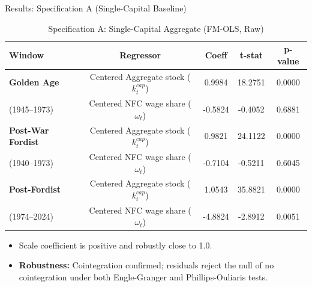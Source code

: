 \documentclass[10pt]{beamer}
\begin{document}
\begin{frame}{Results: Specification A (Single-Capital Baseline)}
  \begin{table}[htbp]
    \centering
    \caption{Specification A: Single-Capital Aggregate (FM-OLS, Raw)}
    \footnotesize
    \begin{tabular}{lcccc}
      \toprule
      \textbf{Window} & \textbf{Regressor} & \textbf{Coeff} & \textbf{t-stat} & \textbf{p-value} \\
      \midrule
      \textbf{Golden Age} & Centered Aggregate stock ($k^{cap}_t$) & 0.9984 & 18.2751 & 0.0000 \\
      (1945--1973) & Centered NFC wage share ($\omega_t$) & -0.5824 & -0.4052 & 0.6881 \\
      \midrule
      \textbf{Post-War Fordist} & Centered Aggregate stock ($k^{cap}_t$) & 0.9821 & 24.1122 & 0.0000 \\
      (1940--1973) & Centered NFC wage share ($\omega_t$) & -0.7104 & -0.5211 & 0.6045 \\
      \midrule
      \textbf{Post-Fordist} & Centered Aggregate stock ($k^{cap}_t$) & 1.0543 & 35.8821 & 0.0000 \\
      (1974--2024) & Centered NFC wage share ($\omega_t$) & -4.8824 & -2.8912 & 0.0051 \\
      \bottomrule
    \end{tabular}
  \end{table}
  \begin{itemize}
    \item Scale coefficient is positive and robustly close to 1.0.
    \item \textbf{Robustness:} Cointegration confirmed; residuals reject the null of no cointegration under both Engle-Granger and Phillips-Ouliaris tests.
  \end{itemize}
\end{frame}
\end{document}
